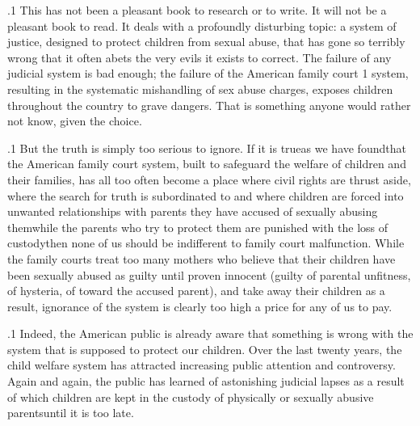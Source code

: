 \documentclass[11pt, twoside]{article}
\begin{document}
\thispagestyle{empty}

{\fontsize{13}{19}\selectfont


\hspace{-5em}\begin{minipage}{1.1\textwidth}
\begin{flushright}
{\fontsize{14}{22}\selectfont
\textbf{%
}
}
\end{flushright}
\end{minipage}


\vspace{6em}





\p.1{%
\noindent{}This has not been a pleasant book to research or to write. It will not be
a pleasant book to read. It deals with a profoundly disturbing topic: a
system of justice, designed to protect children from sexual abuse, that
has gone so terribly wrong that it often abets the very evils it exists to
correct. The failure of any judicial system is bad enough; the failure of
the American family court 1 system, resulting in the systematic mishandling of sex abuse charges, exposes children throughout the country to
grave dangers. That is something anyone would rather not know, given
the choice.
}%

\p.1{%
But the truth is simply too serious to ignore. If it is true\mdash{}as we have
found\mdash{}that the American family court system, built to safeguard the
welfare of children and their families, has all too often become a place
where civil rights are thrust aside, where the search for truth is subordinated to  and where children are forced into unwanted
relationships with parents they have accused of sexually abusing
them\mdash{}while the parents who try to protect them are punished with the loss of
custody\mdash{}then none of us should be indifferent to family court malfunction. While the family courts treat too many mothers who believe that
their children have been sexually abused as guilty until proven innocent (guilty of parental unfitness, of hysteria, of  toward the
accused parent), and take away their children as a result, ignorance of
the system is clearly too high a price for any of us to pay.
}%

\p.1{%
Indeed, the American public is already aware that something is wrong
with the system that is supposed to protect our children. Over the last
twenty years, the child welfare system has attracted increasing public
attention and controversy. Again and again, the public has learned of
astonishing judicial lapses as a result of which children are kept in the
custody of physically or sexually abusive parents\mdash{}until it is too late.
}%

}
\end{document}
